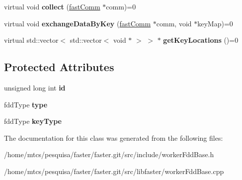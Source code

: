 \begin{DoxyCompactItemize}
\item 
\hypertarget{classfaster_1_1workerFddBase_ab9f9ea54f3480513b53e40760399e569}{}virtual void {\bfseries collect} (\hyperlink{classfaster_1_1fastComm}{fast\+Comm} $\ast$comm)=0\label{classfaster_1_1workerFddBase_ab9f9ea54f3480513b53e40760399e569}

\item 
\hypertarget{classfaster_1_1workerFddBase_a4a9b7afbb072da590bd5d93e46d1052a}{}virtual void {\bfseries exchange\+Data\+By\+Key} (\hyperlink{classfaster_1_1fastComm}{fast\+Comm} $\ast$comm, void $\ast$key\+Map)=0\label{classfaster_1_1workerFddBase_a4a9b7afbb072da590bd5d93e46d1052a}

\item 
\hypertarget{classfaster_1_1workerFddBase_a7ceebadaee829b6c3c8e247060abc41d}{}virtual std\+::vector$<$ std\+::vector$<$ void $\ast$ $>$ $>$ $\ast$ {\bfseries get\+Key\+Locations} ()=0\label{classfaster_1_1workerFddBase_a7ceebadaee829b6c3c8e247060abc41d}

\end{DoxyCompactItemize}
\subsection*{Protected Attributes}
\begin{DoxyCompactItemize}
\item 
\hypertarget{classfaster_1_1workerFddBase_ab131549612a7a269aab35c1920f0e215}{}unsigned long int {\bfseries id}\label{classfaster_1_1workerFddBase_ab131549612a7a269aab35c1920f0e215}

\item 
\hypertarget{classfaster_1_1workerFddBase_a220b88e4e5633d9ee7c8c8697a9ff297}{}fdd\+Type {\bfseries type}\label{classfaster_1_1workerFddBase_a220b88e4e5633d9ee7c8c8697a9ff297}

\item 
\hypertarget{classfaster_1_1workerFddBase_ab5d502564e1c1b12e806033380431afb}{}fdd\+Type {\bfseries key\+Type}\label{classfaster_1_1workerFddBase_ab5d502564e1c1b12e806033380431afb}

\end{DoxyCompactItemize}


The documentation for this class was generated from the following files\+:\begin{DoxyCompactItemize}
\item 
/home/mtcs/pesquisa/faster/faster.\+git/src/include/worker\+Fdd\+Base.\+h\item 
/home/mtcs/pesquisa/faster/faster.\+git/src/libfaster/worker\+Fdd\+Base.\+cpp\end{DoxyCompactItemize}
